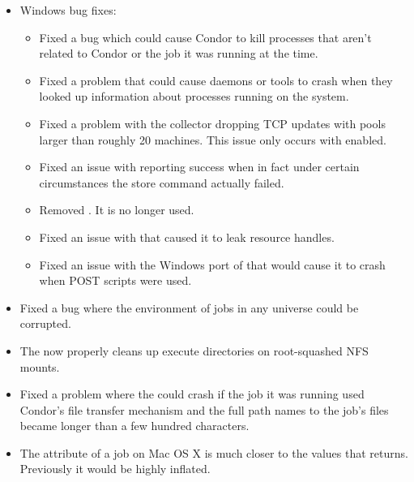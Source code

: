\begin{itemize}

\item Windows bug fixes:
\begin{itemize}
  \item Fixed a bug which could cause Condor to kill processes that
    aren't related to Condor or the job it was running at the time.

  \item Fixed a problem that could cause daemons or tools to crash
    when they looked up information about processes running on the
    system.

  \item Fixed a problem with the collector dropping TCP updates with
    pools larger than roughly 20 machines. This issue only occurs with
     enabled.

  \item Fixed an issue with  reporting success when
   in fact under certain circumstances the store command actually failed.

  \item Removed . It is no longer used.

  \item Fixed an issue with  that caused it to
    leak resource handles.

  \item Fixed an issue with the Windows port of  that
    would cause it to crash when POST scripts were used.

\end{itemize}

\item Fixed a bug where the environment of jobs in any universe could
  be corrupted.

\item The  now properly cleans up execute directories on
  root-squashed NFS mounts.

\item Fixed a problem where the  could crash if the
  job it was running used Condor's file transfer mechanism and the
  full path names to the job's files became longer than a few hundred
  characters.

\item The  attribute of a job on Mac OS X is much
  closer to the values that  returns.
  Previously it would be highly inflated.


\end{itemize}
